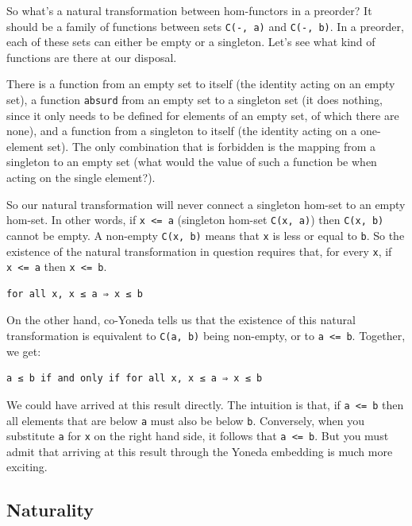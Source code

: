 So what's a natural transformation between hom-functors in a preorder?
It should be a family of functions between sets \texttt{C(-,\ a)} and
\texttt{C(-,\ b)}. In a preorder, each of these sets can either be empty
or a singleton. Let's see what kind of functions are there at our
disposal.

There is a function from an empty set to itself (the identity acting on
an empty set), a function \texttt{absurd} from an empty set to a
singleton set (it does nothing, since it only needs to be defined for
elements of an empty set, of which there are none), and a function from
a singleton to itself (the identity acting on a one-element set). The
only combination that is forbidden is the mapping from a singleton to an
empty set (what would the value of such a function be when acting on the
single element?).

So our natural transformation will never connect a singleton hom-set to
an empty hom-set. In other words, if \texttt{x\ \textless{}=\ a}
(singleton hom-set \texttt{C(x,\ a)}) then \texttt{C(x,\ b)} cannot be
empty. A non-empty \texttt{C(x,\ b)} means that \texttt{x} is less or
equal to \texttt{b}. So the existence of the natural transformation in
question requires that, for every \texttt{x}, if
\texttt{x\ \textless{}=\ a} then \texttt{x\ \textless{}=\ b}.

\begin{verbatim}
for all x, x ≤ a ⇒ x ≤ b
\end{verbatim}

On the other hand, co-Yoneda tells us that the existence of this natural
transformation is equivalent to \texttt{C(a,\ b)} being non-empty, or to
\texttt{a\ \textless{}=\ b}. Together, we get:

\begin{verbatim}
a ≤ b if and only if for all x, x ≤ a ⇒ x ≤ b
\end{verbatim}

We could have arrived at this result directly. The intuition is that, if
\texttt{a\ \textless{}=\ b} then all elements that are below \texttt{a}
must also be below \texttt{b}. Conversely, when you substitute
\texttt{a} for \texttt{x} on the right hand side, it follows that
\texttt{a\ \textless{}=\ b}. But you must admit that arriving at this
result through the Yoneda embedding is much more exciting.

\subsection{Naturality}\label{naturality}

